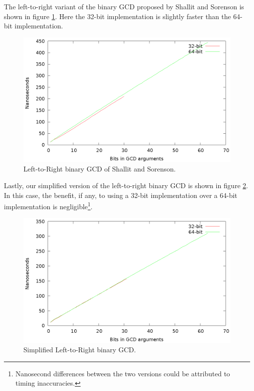 \documentclass{ucalgthes1}
\theoremstyle{definition}
\begin{document}
The left-to-right variant of the binary GCD proposed by Shallit and Sorenson is shown in figure \ref{fig:shallit-32v64}.  Here the 32-bit implementation is slightly faster than the 64-bit implementation.

\begin{figure}[H]
\centering
\includegraphics{shallit-32v64}
\caption{Left-to-Right binary GCD of Shallit and Sorenson.}
\label{fig:shallit-32v64}
\end{figure}

Lastly, our simplified version of the left-to-right binary GCD is shown in figure \ref{fig:binary_l2r-32v64}.  In this case, the benefit, if any, to using a 32-bit implementation over a 64-bit implementation is negligible\footnote{Nanosecond differences between the two versions could be attributed to timing inaccuracies.}.

\begin{figure}[H]
\centering
\includegraphics{binary_l2r-32v64}
\caption{Simplified Left-to-Right binary GCD.}
\label{fig:binary_l2r-32v64}
\end{figure}
\end{document}
